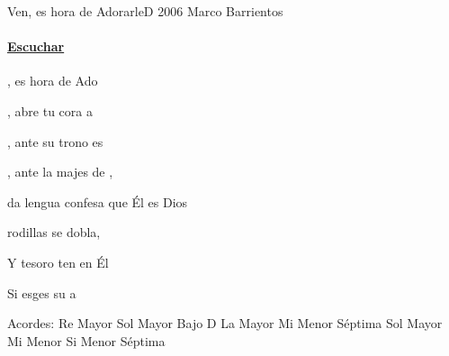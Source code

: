 \documentclass[12pt, spanish]{book}
\begin{document}
    \begin{song}{Ven, es hora de Adorarle}{D}
    {2006} %
    {Marco Barrientos}
    {} %
    {}
        \ifChordBk
            \paragraph{\mbox{}\hfill\protect\href{https://open.spotify.com/intl-es/track/5svALLo67XRjP5lGozAmQq}{Escuchar}\mbox{}\hfill}
        \fi

        \begin{SBOpGroup}
            , es hora de Ado

            , abre tu cora a 

            , ante su trono es

            , ante la majes de ,
        \end{SBOpGroup}

        \begin{SBChorus}
            da lengua confesa que Él es Dios

             rodillas se dobla,

            Y  tesoro ten en Él

            Si esges su a
        \end{SBChorus}

        \ifChordBk
        \begin{SBOpGroup}
            Acordes:\break
            \upchord{\D}\qquad Re Mayor \hfill
            \upchord{\GD}\qquad Sol Mayor Bajo D \hfill\null\break
            \upchord{\A}\qquad La Mayor \hfill
            \upchord{\Emseven}\qquad Mi Menor S\'eptima \hfill
            \upchord{\G}\qquad Sol Mayor \hfill\null\break
            \upchord{\Em}\qquad Mi Menor \hfill
            \upchord{\Bmseven}\qquad Si Menor S\'eptima \hfill\null\break
        \end{SBOpGroup}
        \fi
    \end{song}

    \ifChordBk
        
        \theendnotes
        
        
        
    \fi

    
\end{document}
